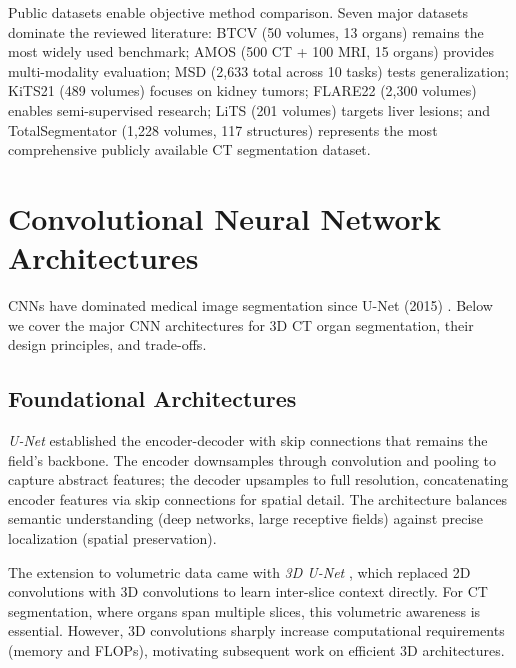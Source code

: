 \documentclass[conference]{IEEEtran}
\begin{document}
Public datasets enable objective method comparison. Seven major datasets dominate the reviewed literature: BTCV \cite{btcv2015} (50 volumes, 13 organs) remains the most widely used benchmark; AMOS \cite{amos2022} (500 CT + 100 MRI, 15 organs) provides multi-modality evaluation; MSD \cite{msd2022} (2,633 total across 10 tasks) tests generalization; KiTS21 \cite{kits2020} (489 volumes) focuses on kidney tumors; FLARE22 \cite{flare2022} (2,300 volumes) enables semi-supervised research; LiTS \cite{lits2022} (201 volumes) targets liver lesions; and TotalSegmentator \cite{wasserthal2023totalsegmentator} (1,228 volumes, 117 structures) represents the most comprehensive publicly available CT segmentation dataset.

\FloatBarrier

\section{Convolutional Neural Network Architectures}
\label{sec:convolutional}

CNNs have dominated medical image segmentation since U-Net (2015) \cite{ronneberger2015unet}. Below we cover the major CNN architectures for 3D CT organ segmentation, their design principles, and trade-offs.

\subsection{Foundational Architectures}

\emph{U-Net} \cite{ronneberger2015unet} established the encoder-decoder with skip connections that remains the field's backbone. The encoder downsamples through convolution and pooling to capture abstract features; the decoder upsamples to full resolution, concatenating encoder features via skip connections for spatial detail. The architecture balances semantic understanding (deep networks, large receptive fields) against precise localization (spatial preservation).

The extension to volumetric data came with \emph{3D U-Net} \cite{cicek20163dunet}, which replaced 2D convolutions with 3D convolutions to learn inter-slice context directly. For CT segmentation, where organs span multiple slices, this volumetric awareness is essential. However, 3D convolutions sharply increase computational requirements (memory and FLOPs), motivating subsequent work on efficient 3D architectures.
\end{document}
